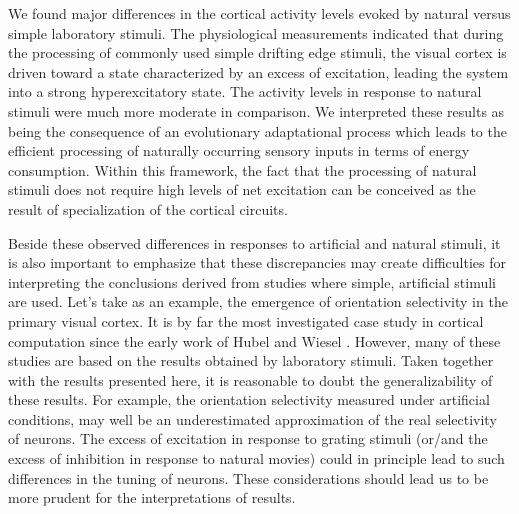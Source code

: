 We found major differences in the cortical activity levels evoked by
natural versus simple laboratory stimuli. The physiological measurements
indicated that during the processing of commonly used simple drifting edge
stimuli, the visual cortex is driven toward a state characterized by an
excess of excitation, leading the system into a strong hyperexcitatory
state. The activity levels in response to natural stimuli were much more
moderate in comparison. We interpreted these results as being the
consequence of an evolutionary adaptational process which leads to the
efficient processing of naturally occurring sensory inputs in terms of
energy consumption.  Within this framework, the fact that the processing of
natural stimuli does not require high levels of net excitation can be
conceived as the result of specialization of the cortical circuits.


Beside these observed differences in responses to artificial and natural
stimuli, it is also important to emphasize that these discrepancies may
create difficulties for interpreting the conclusions derived from studies
where simple, artificial stimuli are used. Let's take as an example, the
emergence of orientation selectivity in the primary visual cortex. It is by
far the most investigated case study in cortical computation since the
early work of Hubel and Wiesel \citep{priebe2008a}. However, many of these
studies are based on the results obtained by laboratory stimuli. Taken
together with the results presented here, it is reasonable to doubt the
generalizability of these results. For example, the orientation selectivity
measured under artificial conditions, may well be an underestimated
approximation of the real selectivity of neurons. The excess of excitation
in response to grating stimuli (or/and the excess of inhibition in response
to natural movies) could in principle lead to such differences in the
tuning of neurons. These considerations should lead us to be more prudent
for the interpretations of results.


